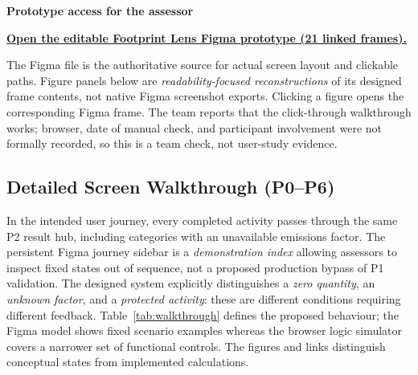 \documentclass[12pt,a4paper]{article}
\begin{document}
\begin{keybox}
\textbf{\sffamily\color{Navy}Prototype access for the assessor}\par
\href{https://www.figma.com/design/L1kEH28shvU8494m2Y7EnT}{\sffamily\bfseries\color{Teal}Open the editable Footprint Lens Figma prototype (21 linked frames).}\par
The Figma file is the authoritative source for actual screen layout and clickable paths. Figure panels below are \emph{readability-focused reconstructions} of its designed frame contents, not native Figma screenshot exports. Clicking a figure opens the corresponding Figma frame. The team reports that the click-through walkthrough works; browser, date of manual check, and participant involvement were not formally recorded, so this is a team check, not user-study evidence.
\end{keybox}

\subsection{Detailed Screen Walkthrough (P0--P6)}
In the intended user journey, every completed activity passes through the same P2 result hub, including categories with an unavailable emissions factor. The persistent Figma journey sidebar is a \emph{demonstration index} allowing assessors to inspect fixed states out of sequence, not a proposed production bypass of P1 validation. The designed system explicitly distinguishes a \emph{zero quantity}, an \emph{unknown factor}, and a \emph{protected activity}: these are different conditions requiring different feedback. Table~\ref{tab:walkthrough} defines the proposed behaviour; the Figma model shows fixed scenario examples whereas the browser logic simulator covers a narrower set of functional controls. The figures and links distinguish conceptual states from implemented calculations.
\end{document}
